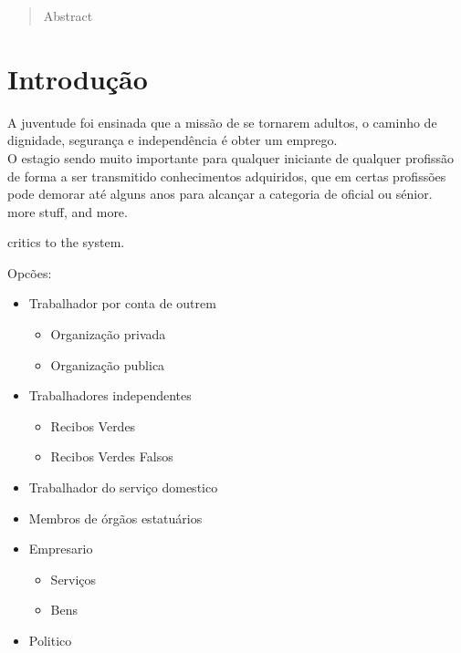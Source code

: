 

\tableofcontents
\appendix
\pagestyle{plain} %
\captionsetup{justification = raggedright, singlelinecheck = false}
\setlength{\parindent}{0in}
\label{Resumo}
\begin{abstract}
Abstract
\end{abstract}
\newpage
\section{Introdução}
\qquad A juventude foi ensinada que a missão de se tornarem adultos, o caminho de dignidade, segurança e independência é obter um emprego.\\
O estagio sendo muito importante para qualquer iniciante de qualquer profissão de forma a ser transmitido conhecimentos adquiridos, que em certas profissões pode demorar até alguns anos para alcançar a categoria de oficial ou sénior.\\

more stuff, and more.


critics to the system.

\begin{minipage}[t]{\linewidth}
\quad Opcões:
\begin{itemize}
\setlength\itemsep{-0.3em}
\item Trabalhador por conta de outrem
\begin{itemize}
\item Organização privada
\item Organização publica
\end{itemize}
\item Trabalhadores independentes
\begin{itemize}
\item Recibos Verdes
\item Recibos Verdes Falsos
\end{itemize}
\newpage
\item Trabalhador do serviço domestico
\item Membros de órgãos estatuários
\item Empresario
\begin{itemize}
\item Serviços
\item Bens
\end{itemize}
\item Politico\\ \\
\end{itemize}
\end{minipage}\par

